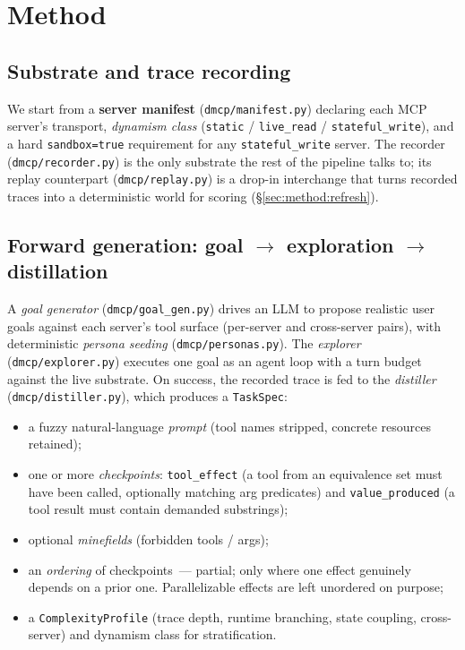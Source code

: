 \section{Method}
\label{sec:method}



\subsection{Substrate and trace recording}
\label{sec:method:substrate}

We start from a \textbf{server manifest} (\texttt{dmcp/manifest.py})
declaring each MCP server's transport, \emph{dynamism class}
(\texttt{static} / \texttt{live\_read} / \texttt{stateful\_write}), and
a hard \texttt{sandbox=true} requirement for any
\texttt{stateful\_write} server. The recorder
(\texttt{dmcp/recorder.py}) is the only substrate the rest of the
pipeline talks to; its replay counterpart (\texttt{dmcp/replay.py}) is a
drop-in interchange that turns recorded traces into a deterministic
world for scoring (\S\ref{sec:method:refresh}).

\subsection{Forward generation: goal $\to$ exploration $\to$ distillation}
\label{sec:method:gen}

A \emph{goal generator} (\texttt{dmcp/goal\_gen.py}) drives an LLM to
propose realistic user goals against each server's tool surface
(per-server and cross-server pairs), with deterministic \emph{persona
seeding} (\texttt{dmcp/personas.py}). The \emph{explorer}
(\texttt{dmcp/explorer.py}) executes one goal as an agent loop with a
turn budget against the live substrate. On success, the recorded trace
is fed to the \emph{distiller} (\texttt{dmcp/distiller.py}), which
produces a \texttt{TaskSpec}:

\begin{itemize}
  \item a fuzzy natural-language \emph{prompt} (tool names stripped,
    concrete resources retained);
  \item one or more \emph{checkpoints}: \texttt{tool\_effect} (a tool
    from an equivalence set must have been called, optionally matching
    arg predicates) and \texttt{value\_produced} (a tool result must
    contain demanded substrings);
  \item optional \emph{minefields} (forbidden tools / args);
  \item an \emph{ordering} of checkpoints~--- partial; only where one
    effect genuinely depends on a prior one. Parallelizable effects are
    left unordered on purpose;
  \item a \texttt{ComplexityProfile} (trace depth, runtime branching,
    state coupling, cross-server) and dynamism class for stratification.
\end{itemize}

